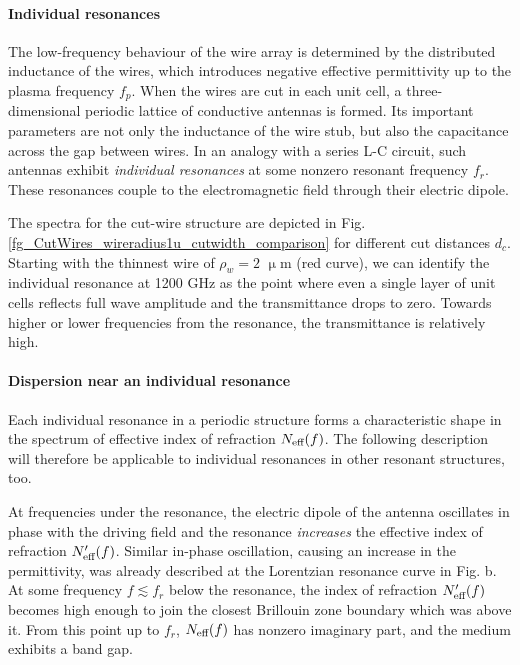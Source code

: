 \paragraph{Individual resonances}
The low-frequency behaviour of the wire array is determined by the distributed inductance of the wires, which introduces negative effective permittivity up to the plasma frequency $f_p$. When the wires are cut in each unit cell, a three-dimensional periodic lattice of conductive antennas is formed. Its important parameters are not only the inductance of the wire stub, but also the capacitance across the gap between wires. In an analogy with a series L-C circuit, such antennas exhibit \textit{individual resonances} at some nonzero resonant frequency $f_r$. These resonances couple to the electromagnetic field through their electric dipole.

The spectra for the cut-wire structure are depicted in Fig. \ref{fg_CutWires_wireradius1u_cutwidth_comparison} for different cut distances $d_c$. Starting with the thinnest wire of $\rho_w = 2$ $\upmu$m (red curve), we can identify the individual resonance at 1200 GHz as the point where even a single layer of unit cells reflects full wave amplitude and the transmittance drops to zero. Towards higher or lower frequencies from the resonance, the transmittance is relatively high.

\paragraph{Dispersion near an individual resonance}
Each individual resonance in a periodic structure forms a characteristic shape in the spectrum of effective index of refraction $N_{\text{eff} }(f)$. The following description will therefore be applicable to individual resonances in other resonant structures, too. 

At frequencies under the resonance, the electric dipole of the antenna oscillates in phase with the driving field and the resonance \textit{increases} the effective index of refraction $N_{\text{eff} }'(f)$. 
Similar in-phase oscillation, causing an increase in the permittivity, was already described at the Lorentzian resonance curve in Fig. \label{fg_oscillator_spectrum}b. 
At some frequency $f \lesssim f_r$ below the resonance, the index of refraction $N_{\text{eff} }'(f)$ becomes high enough to join the closest Brillouin zone boundary which was above it. From this point up to $f_r$, $N_{\text{eff} }(f)$ has nonzero imaginary part, and the medium exhibits a band gap.

